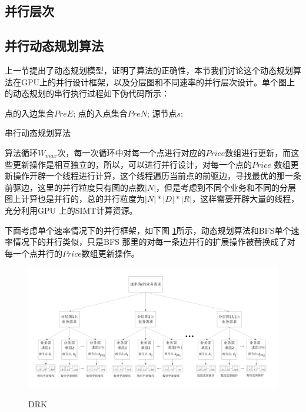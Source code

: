 \subsection{并行层次}
\subsection{并行动态规划算法}

上一节提出了动态规划模型，证明了算法的正确性，本节我们讨论这个动态规划算法在GPU上的并行设计框架，以及分层图和不同速率的并行层次设计。单个图上的动态规划的串行执行过程如下伪代码所示：
\begin{algorithm}[t]
\begin{algorithmic}[1]
\Require
点的入边集合$PreE$;
点的入点集合$PreN$;
源节点$s$;
\EndFor
\EndFor
\end{algorithmic}
\caption{{串行动态规划算法}}
\label{pda}
\end{algorithm}

算法循环$W_{max}$次，每一次循环中对每一个点进行对应的$Price$数组进行更新，而这些更新操作是相互独立的，所以，可以进行并行设计，对每一个点的$Price$ 数组更新操作开辟一个线程进行计算，这个线程遍历当前点的前驱边，寻找最优的那一条前驱边，这里的并行粒度只有图的点数$|N|$，但是考虑到不同个业务和不同的分层图上计算也是并行的，总的并行粒度为$|N|*|D|*|R|$，这样需要开辟大量的线程，充分利用GPU 上的SIMT计算资源。

下面考虑单个速率情况下的并行框架，如下图 \ref{DRK}所示，动态规划算法和BFS单个速率情况下的并行类似，只是BFS 那里的对每一条边并行的扩展操作被替换成了对每一个点并行的$Price$数组更新操作。
\begin{figure}
\setlength{\belowcaptionskip}{-0.5cm}
\begin{center}
{\includegraphics[width=1 \textwidth]{figures/DRK.pdf}}
\end{center}
\caption{{\footnotesize{DRK}}}
\label{DRK}
\end{figure}

